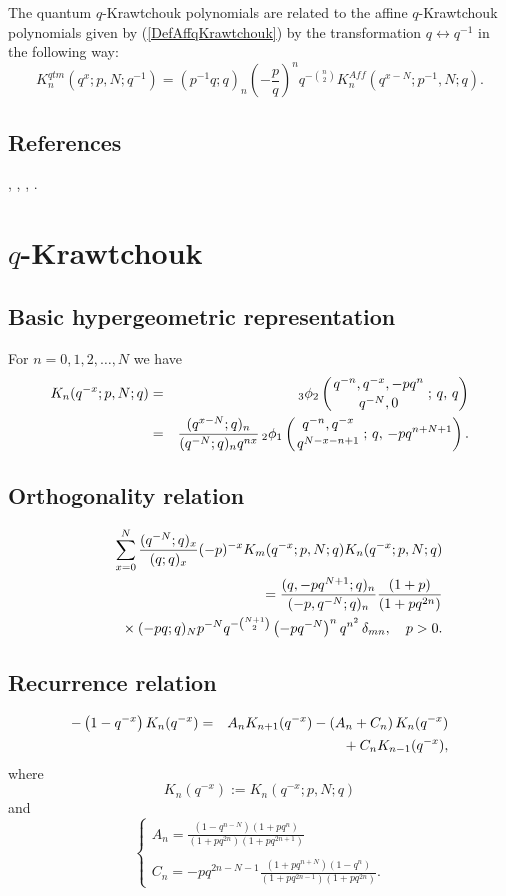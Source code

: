 \documentclass[envcountchap,graybox]{svmono}
\newcommand{\qhyp}[5]{\mbox{}_{#1}{\phi}_{#2}
\left(\genfrac{}{}{0pt}{}{#3}{#4}\,;\,q,\,#5\right)}
\newcommand{\mathindent}{\hspace{7.5mm}}
\begin{document}
\noindent
The quantum $q$-Krawtchouk polynomials are related to the affine
$q$-Krawtchouk polynomials given by (\ref{DefAffqKrawtchouk})
by the transformation $q\leftrightarrow q^{-1}$ in the following way:
$$K_n^{qtm}(q^x;p,N;q^{-1})=(p^{-1}q;q)_n\left(-\frac{p}{q}\right)^nq^{-\binom{n}{2}}
K_n^{Aff}(q^{x-N};p^{-1},N;q).$$

\subsection*{References}
\cite{GasperRahman90}, \cite{Koorn89III}, \cite{Koorn90II}, \cite{Smirnov}.


\section{$q$-Krawtchouk}
\par\setcounter{equation}{0}

\subsection*{Basic hypergeometric representation} For $n=0,1,2,\ldots,N$ we have
\begin{eqnarray}
\label{DefqKrawtchouk}
K_n(q^{-x};p,N;q)&=&\qhyp{3}{2}{q^{-n},q^{-x},-pq^n}{q^{-N},0}{q}\\
&=&\frac{(q^{x-N};q)_n}{(q^{-N};q)_nq^{nx}}\,
\qhyp{2}{1}{q^{-n},q^{-x}}{q^{N-x-n+1}}{-pq^{n+N+1}}.\nonumber
\end{eqnarray}

\subsection*{Orthogonality relation}
\begin{eqnarray}
\label{OrtqKrawtchouk}
& &\sum_{x=0}^N\frac{(q^{-N};q)_x}{(q;q)_x}(-p)^{-x}K_m(q^{-x};p,N;q)K_n(q^{-x};p,N;q)\nonumber\\
& &{}=\frac{(q,-pq^{N+1};q)_n}{(-p,q^{-N};q)_n}\frac{(1+p)}{(1+pq^{2n})}\nonumber\\
& &{}\mathindent{}\times (-pq;q)_Np^{-N}q^{-\binom{N+1}{2}}
\left(-pq^{-N}\right)^nq^{n^2}\,\delta_{mn},\quad p>0.
\end{eqnarray}

\subsection*{Recurrence relation}
\begin{eqnarray}
\label{RecqKrawtchouk}
-\left(1-q^{-x}\right)K_n(q^{-x})&=&A_nK_{n+1}(q^{-x})-\left(A_n+C_n\right)K_n(q^{-x})\nonumber\\
& &{}\mathindent{}+C_nK_{n-1}(q^{-x}),
\end{eqnarray}
where
$$K_n(q^{-x}):=K_n(q^{-x};p,N;q)$$
and
$$\left\{\begin{array}{l}
\displaystyle A_n=\frac{(1-q^{n-N})(1+pq^n)}{(1+pq^{2n})(1+pq^{2n+1})}\\
\\
\displaystyle C_n=-pq^{2n-N-1}\frac{(1+pq^{n+N})(1-q^n)}{(1+pq^{2n-1})(1+pq^{2n})}.
\end{array}\right.$$
\end{document}
